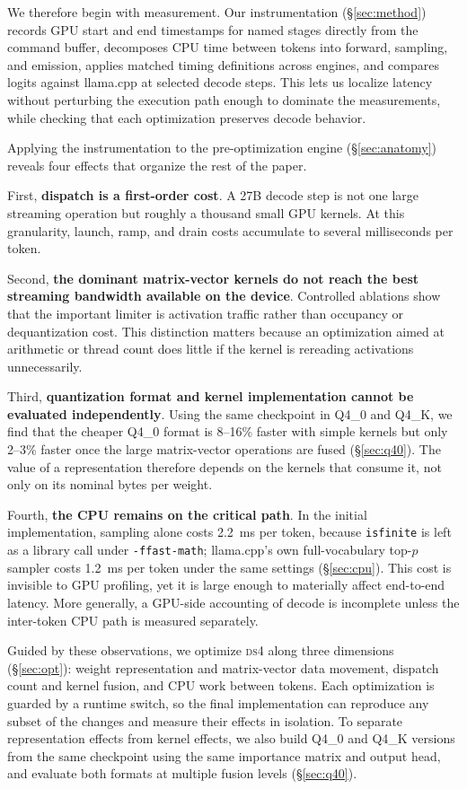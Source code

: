 \documentclass[11pt]{article}
\newcommand{\ds}{\textsc{ds4}}
\begin{document}
We therefore begin with measurement. Our instrumentation
(\S\ref{sec:method}) records GPU start and end timestamps for named stages
directly from the command buffer, decomposes CPU time between tokens into
forward, sampling, and emission, applies matched timing definitions across
engines, and compares logits against llama.cpp at selected decode steps.
This lets us localize latency without perturbing the execution path enough
to dominate the measurements, while checking that each optimization
preserves decode behavior.

Applying the instrumentation to the pre-optimization engine
(\S\ref{sec:anatomy}) reveals four effects that organize the rest of the
paper.

First, \textbf{dispatch is a first-order cost}. A 27B decode step is not
one large streaming operation but roughly a thousand small GPU kernels. At
this granularity, launch, ramp, and drain costs accumulate to several
milliseconds per token.

Second, \textbf{the dominant matrix-vector kernels do not reach the best
streaming bandwidth available on the device}. Controlled ablations show
that the important limiter is activation traffic rather than occupancy or
dequantization cost. This distinction matters because an optimization aimed
at arithmetic or thread count does little if the kernel is rereading
activations unnecessarily.

Third, \textbf{quantization format and kernel implementation cannot be
evaluated independently}. Using the same checkpoint in Q4\_0 and Q4\_K, we
find that the cheaper Q4\_0 format is 8--16\% faster with simple kernels
but only 2--3\% faster once the large matrix-vector operations are fused
(\S\ref{sec:q40}). The value of a representation therefore depends on the
kernels that consume it, not only on its nominal bytes per weight.

Fourth, \textbf{the CPU remains on the critical path}. In the initial
implementation, sampling alone costs 2.2~ms per token, because
\texttt{isfinite} is left as a library call under \texttt{-ffast-math};
llama.cpp's own full-vocabulary top-$p$ sampler costs 1.2~ms per token
under the same settings (\S\ref{sec:cpu}). This cost is invisible to GPU profiling, yet it is
large enough to materially affect end-to-end latency. More generally, a
GPU-side accounting of decode is incomplete unless the inter-token CPU path
is measured separately.

Guided by these observations, we optimize \ds{} along three dimensions
(\S\ref{sec:opt}): weight representation and matrix-vector data movement,
dispatch count and kernel fusion, and CPU work between tokens. Each
optimization is guarded by a runtime switch, so the final implementation
can reproduce any subset of the changes and measure their effects in
isolation. To separate representation effects from kernel effects, we also
build Q4\_0 and Q4\_K versions from the same checkpoint using the same
importance matrix and output head, and evaluate both formats at multiple
fusion levels (\S\ref{sec:q40}).
\end{document}

